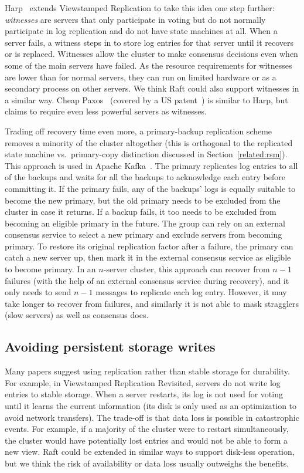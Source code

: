 Harp~\cite{Liskov:1991} extends Viewstamped Replication to take this
idea one step further: \emph{witnesses} are servers that only
participate in voting but do not normally participate in log replication
and do not have state machines at all. When a server fails, a witness
steps in to store log entries for that server until it recovers or is
replaced. Witnesses allow the cluster to make consensus decisions even
when some of the main servers have failed. As the resource
requirements for witnesses are lower than for normal servers, they can
run on limited hardware or as a secondary process on other servers. We
think Raft could also support witnesses in a similar way. Cheap
Paxos~\cite{Lamport:2004} (covered by a US
patent~\cite{Lamport:2010cheap}) is similar to Harp, but claims to
require even less powerful servers as witnesses.

Trading off recovery time even more, a primary-backup replication scheme
removes a minority of the cluster altogether (this is orthogonal to the
replicated state machine vs.\ primary-copy distinction discussed in
Section~\ref{related:rsm}).
This approach is used in Apache Kafka~\cite{Rao:2013}.
The primary replicates log entries to all of
the backups and waits for all the backups to acknowledge each entry
before committing it. If the primary fails, any of the backups' logs is
equally suitable to become the new primary, but the old primary needs to
be excluded from the cluster in case it returns. If a backup fails, it
too needs to be excluded from becoming an eligible primary in the future.
The group can rely on an external consensus service to select a new
primary and exclude servers from becoming primary. To restore its
original replication factor after a failure, the primary can catch a new
server up, then mark it in the external consensus service as eligible
to become primary. In an
$n$-server cluster, this approach can recover from $n-1$ failures (with
the help of an external consensus service during recovery), and it only
needs to send $n-1$ messages to replicate each log entry. However, it
may take longer to recover from failures, and similarly it is not able
to mask stragglers (slow servers) as well as consensus does.

\subsection{Avoiding persistent storage writes}

Many papers suggest using replication rather than stable storage for
durability. For example, in Viewstamped Replication Revisited, servers
do not write log entries to stable storage. When a server restarts, its
log is not used for voting until it learns the current information (its
disk is only used as an optimization to avoid network transfers). The
trade-off is that data loss is possible in catastrophic events. For
example, if a majority of the cluster were to restart simultaneously, the
cluster would have potentially lost entries and would not be able to
form a new view. Raft could be extended in similar ways to support
disk-less operation, but we think the risk of availability or data loss
usually outweighs the benefits.
